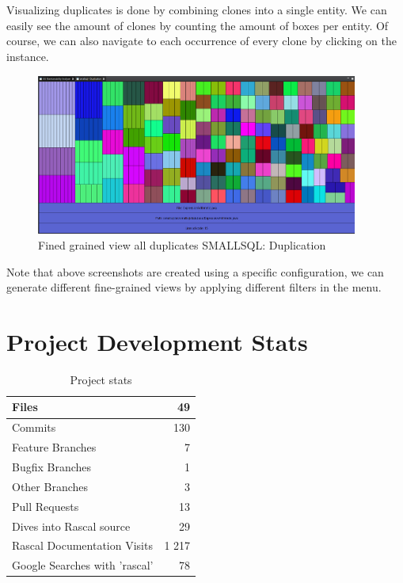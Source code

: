 \documentclass{article}
\begin{document}
\clearpage 

Visualizing duplicates is done by combining clones into a single entity. 
We can easily see the amount of clones by counting the amount of boxes per entity.
Of course, we can also navigate to each occurrence of every clone by clicking on the instance.

\begin{figure}[!htbp]
	\centering
	\label{fig:duplication}
	\caption{Fined grained view all duplicates SMALLSQL: Duplication}
	\includegraphics[width=400px, height=200px]{smallsql_duplication.png}
\end{figure}

Note that above screenshots are created using a specific configuration, we can generate different fine-grained views by applying different filters in the menu.

\section{Project Development Stats}

\begin{table}[!htb]
\caption{Project stats}
\begin{tabular}{l|r}	
		\hline
		Files										&			49 \\
		\hline
		Commits										&			130 \\
		\hline
		Feature Branches							&			7 \\
		\hline
		Bugfix Branches								&			1 \\
		\hline
		Other Branches								&			3 \\
		\hline	
		Pull Requests								&			13 \\
		\hline	
		Dives into Rascal source					&			29 \\
		\hline		
		Rascal Documentation Visits					&			1 217 \\ %
		\hline		
		Google Searches with 'rascal'				&			78 \\	%
		\hline		
\end{tabular}
\end{table}
\end{document}
